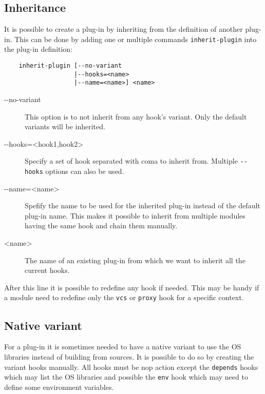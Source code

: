 \documentclass[a4paper,12pt,twoside]{article}
\newcommand{\code}[1]{\texttt{#1}}
\newcommand{\ddash}{-{}-}
\begin{document}
\subsection{Inheritance}
\label{inheritance}

It is possible to create a plug-in by inheriting from the definition
of another plug-in. This can be done by adding one or multiple commands \code{inherit-plugin} into the plug-in definition:

\begin{lstlisting}
	inherit-plugin [--no-variant
	               |--hooks=<name>
	               |--name=<name>] <name>
\end{lstlisting}

\begin{description}
	\item[\ddash{}no-variant] This option is to not inherit from any hook's variant. Only the default variants will be inherited.
	\item[\ddash{}hooks=<hook1,hook2>] Specify a set of hook separated with coma to inherit from. Multiple \code{\ddash{}hooks} options can also be used.
	\item[\ddash{}name=<name>] Spefify the name to be used for the inherited plug-in instead of the default plug-in name. This makes it possible to inherit from multiple modules having the same hook and chain them manually.
	\item[<name>] The name of an existing plug-in from which we want to inherit all the current hooks.
\end{description}

After this line it is possible to redefine any hook if needed. This may be handy if a module need to redefine only
the \code{vcs} or \code{proxy} hook for a specific context.

\subsection{Native variant}
\label{native variant}

For a plug-in it is sometimes needed to have a native variant to use the OS libraries instead of building from sources. It is possible to do so by creating the variant hooks manually. All hooks must be nop action except the \code{depends} hooks which may list the OS libraries and possible the \code{env} hook which may need to define some environment variables.
\end{document}

